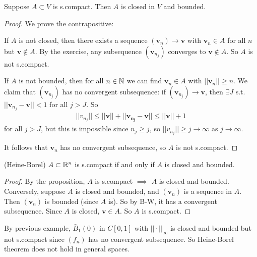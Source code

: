 \documentclass[a4paper]{article}
\begin{document}
\begin{prop}
Suppose $A \subset V$ is s.compact. Then $A$ is closed in $V$ and bounded.
\begin{proof}
We prove the contrapositive:

If $A$ is not closed, then there exists a sequence $\left(\mathbf{v}_n\right) \to \mathbf{v}$ with $\mathbf{v}_n \in A$ for all $n$ but $\mathbf{v} \not\in A$. By the exercise, any subsequence $\left(\mathbf{v}_{n_j}\right)$ converges to $\mathbf{v} \not\in A$. So $A$ is not s.compact.

If $A$ is not bounded, then for all $n \in \mathbb{N}$ we can find $\mathbf{v}_n \in A$ with $||\mathbf{v}_n|| \geq n$. We claim that $\left(\mathbf{v}_{n_j}\right)$ has no convergent subsequence: if $\left(\mathbf{v}_{n_j}\right) \to \mathbf{v}$, then $\exists J$ s.t. $||\mathbf{v}_{n_j} - \mathbf{v}|| < 1$ for all $j > J$. So
\begin{equation*}
\begin{aligned}
||v_{n_j}|| \leq ||\mathbf{v}|| + ||\mathbf{v_{n_j}} - \mathbf{v}|| \leq ||\mathbf{v}|| + 1
\end{aligned}
\end{equation*}
for all $j>J$, but this is impossible since $n_j\geq j$, so $||v_{n_j}|| \geq j \to \infty$ as $j \to \infty$.

It follows that $\mathbf{v}_n$ has no convergent subsequence, so $A$ is not s.compact.
\end{proof}
\end{prop}

\begin{thm} (Heine-Borel) $A \subset \mathbb{R}^n$ is s.compact if and only if $A$ is closed and bounded.
\begin{proof}
By the proposition, $A$ is s.compact $\implies$ $A$ is closed and bounded.\\
Conversely, suppose $A$ is closed and bounded, and $\left(\mathbf{v}_n\right)$ is a sequence in $A$. Then $\left(\mathbf{v}_n\right)$ is bounded (since $A$ is). So by B-W, it has a convergent subsequence. Since $A$ is closed, $\mathbf{v} \in A$. So $A$ is s.compact.
\end{proof}
\end{thm}

\begin{rem}
By previous example, $\bar{B}_1\left(0\right)$ in $C\left[0,1\right]$ with $||\cdot||_\infty$ is closed and bounded but not s.compact since $\left(f_n\right)$ has no convergent subsequence. So Heine-Borel theorem does not hold in general spaces.
\end{rem}
\end{document}
